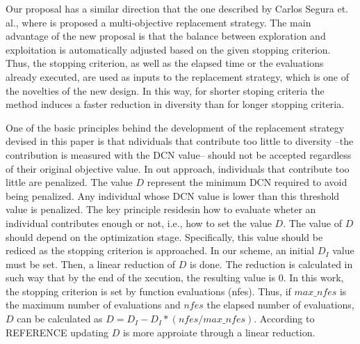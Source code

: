 Our proposal has a similar direction that the one described by Carlos Segura et. al., where is proposed a multi-objective replacement strategy.
%
The main advantage of the new proposal is that the balance between exploration and exploitation is automatically adjusted based on the given stopping criterion.
%
Thus, the stopping criterion, as well as the elapsed time or the evaluations already executed, are used as inputs to the replacement strategy, which is one of the novelties of the new design.
%
In this way, for shorter stoping criteria the method induces a faster reduction in diversity than for longer stopping criteria.


One of the basic principles behind the development of the replacement strategy devised in this paper  is that ndividuals that contribute too little to diversity --the contribution is measured with the DCN value-- should not be accepted regardless of their original objective value.
%
In out approach, individuals that contribute too little are penalized.
%
The value $D$ represent the minimum DCN required to avoid being penalized.
%
Any individual whose DCN value is lower than this threshold value is penalized.
%
The key principle residesin how to evaluate wheter an individual contributes enough or not, i.e., how to set the value $D$.
%
The value of $D$ should depend on the optimization stage.
%
Specifically, this value should be rediced as the stopping criterion is approached.
%
In our scheme, an initial $D_I$ value must be set.
%
Then, a linear reduction of $D$ is done.
%
The reduction is calculated in such way that by the end of the xecution, the resulting value is $0$.
%
In this work, the stopping criterion is set by function evaluations (nfes).
%
Thus, if $max\_nfes$ is the maximum number of evaluations and $nfes$ the elapsed number of evaluations, $D$ can be calculated as $D=D_I - D_I *(nfes/max\_nfes)$.
%
According to REFERENCE updating $D$ is more approiate through a linear reduction.
